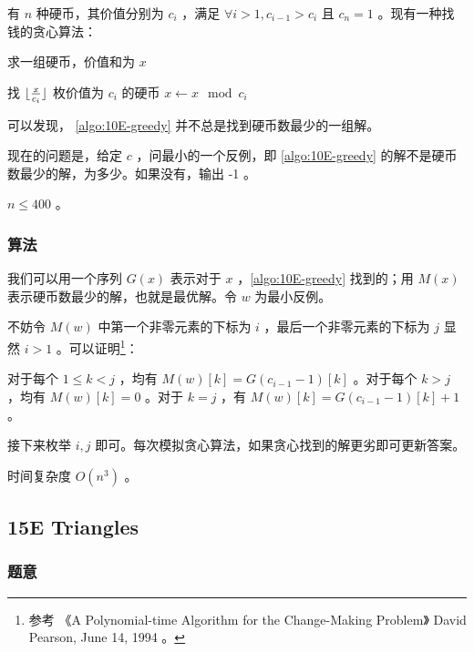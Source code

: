 \documentclass[11pt]{article}
\begin{document}
    有 $n$ 种硬币，其价值分别为 $c_i$ ，满足 $\forall i > 1, c_{i - 1} > c_i$ 且 $c_n= 1$ 。现有一种找钱的贪心算法：
\begin{algorithm}
  \label{algo:10E-greedy}
  \caption{求一组硬币，价值和为 $x$}
  \begin{algorithmic}
        \STATE 找 ${\lfloor \frac{x}{c_i} \rfloor}$ 枚价值为 $c_i$ 的硬币
        \STATE $x \leftarrow x \mod{c_i}$
     \ENDFOR
  \end{algorithmic}
\end{algorithm}
    可以发现， \ref{algo:10E-greedy} 并不总是找到硬币数最少的一组解。

    现在的问题是，给定 $c$ ，问最小的一个反例，即 \ref{algo:10E-greedy} 的解不是硬币数最少的解，为多少。如果没有，输出 -1 。

    $n \leq 400$ 。
\subsubsection{算法}
\label{sec-1-4-2}

    我们可以用一个序列 $G(x)$ 表示对于 $x$ ，\ref{algo:10E-greedy} 找到的；用 $M(x)$ 表示硬币数最少的解，也就是最优解。令 $w$ 为最小反例。

    不妨令 $M(w)$ 中第一个非零元素的下标为 $i$ ，最后一个非零元素的下标为 $j$ 显然 $i > 1$ 。可以证明\footnote{参考 《A Polynomial-time Algorithm for the Change-Making Problem》 David Pearson, June 14, 1994 。
 }：
\begin{theorem}
对于每个 $1 \leq k < j$ ，均有 $M(w)[k] = G(c_{i - 1} - 1)[k]$ 。对于每个 $k > j$ ，均有 $M(w)[k] = 0$ 。对于 $k = j$ ，有 $M(w)[k] = G(c_{i - 1} - 1)[k] + 1$ 。
\end{theorem}

    接下来枚举 $i, j$ 即可。每次模拟贪心算法，如果贪心找到的解更劣即可更新答案。

    时间复杂度 $O(n^3)$ 。
\subsection{15E   Triangles}
\label{sec-1-5}
\subsubsection{题意}
\label{sec-1-5-1}
\end{document}
